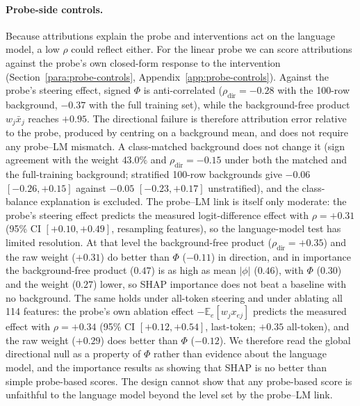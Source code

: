 \paragraph{Probe-side controls.} Because attributions explain the probe and interventions act on the language model, a low $\rho$ could reflect either. For the linear probe we can score attributions against the probe's own closed-form response to the intervention (Section~\ref{para:probe-controls}, Appendix~\ref{app:probe-controls}). Against the probe's steering effect, signed $\Phi$ is anti-correlated ($\rho_{\text{dir}}=-0.28$ with the 100-row background, $-0.37$ with the full training set), while the background-free product $w_j\bar{x}_j$ reaches $+0.95$. The directional failure is therefore attribution error relative to the probe, produced by centring on a background mean, and does not require any probe--LM mismatch. A class-matched background does not change it (sign agreement with the weight $43.0\%$ and $\rho_{\text{dir}}=-0.15$ under both the matched and the full-training background; stratified 100-row backgrounds give $-0.06$ $[-0.26,+0.15]$ against $-0.05$ $[-0.23,+0.17]$ unstratified), and the class-balance explanation is excluded. The probe--LM link is itself only moderate: the probe's steering effect predicts the measured logit-difference effect with $\rho=+0.31$ (95\% CI $[+0.10,+0.49]$, resampling features), so the language-model test has limited resolution. At that level the background-free product ($\rho_{\text{dir}}=+0.35$) and the raw weight ($+0.31$) do better than $\Phi$ ($-0.11$) in direction, and in importance the background-free product ($0.47$) is as high as mean $|\phi|$ ($0.46$), with $\Phi$ ($0.30$) and the weight ($0.27$) lower, so SHAP importance does not beat a baseline with no background. The same holds under all-token steering and under ablating all 114 features: the probe's own ablation effect $-\mathbb{E}_e[w_jx_{ej}]$ predicts the measured effect with $\rho=+0.34$ (95\% CI $[+0.12,+0.54]$, last-token; $+0.35$ all-token), and the raw weight ($+0.29$) does better than $\Phi$ ($-0.12$). We therefore read the global directional null as a property of $\Phi$ rather than evidence about the language model, and the importance results as showing that SHAP is no better than simple probe-based scores. The design cannot show that any probe-based score is unfaithful to the language model beyond the level set by the probe--LM link.

